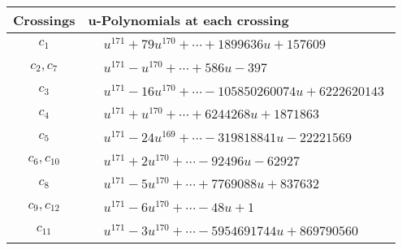 \documentclass[1p]{elsarticle_modified}
\theoremstyle{definition}
\begin{document}
\begin{tabular}{m{50pt}|m{274pt}}
Crossings & \hspace{64pt}u-Polynomials at each crossing \\
\hline $$\begin{aligned}c_{1}\end{aligned}$$&$\begin{aligned}
&u^{171}+79 u^{170}+\cdots+1899636 u+157609
\end{aligned}$\\
\hline $$\begin{aligned}c_{2},c_{7}\end{aligned}$$&$\begin{aligned}
&u^{171}- u^{170}+\cdots+586 u-397
\end{aligned}$\\
\hline $$\begin{aligned}c_{3}\end{aligned}$$&$\begin{aligned}
&u^{171}-16 u^{170}+\cdots-105850260074 u+6222620143
\end{aligned}$\\
\hline $$\begin{aligned}c_{4}\end{aligned}$$&$\begin{aligned}
&u^{171}+u^{170}+\cdots+6244268 u+1871863
\end{aligned}$\\
\hline $$\begin{aligned}c_{5}\end{aligned}$$&$\begin{aligned}
&u^{171}-24 u^{169}+\cdots-319818841 u-22221569
\end{aligned}$\\
\hline $$\begin{aligned}c_{6},c_{10}\end{aligned}$$&$\begin{aligned}
&u^{171}+2 u^{170}+\cdots-92496 u-62927
\end{aligned}$\\
\hline $$\begin{aligned}c_{8}\end{aligned}$$&$\begin{aligned}
&u^{171}-5 u^{170}+\cdots+7769088 u+837632
\end{aligned}$\\
\hline $$\begin{aligned}c_{9},c_{12}\end{aligned}$$&$\begin{aligned}
&u^{171}-6 u^{170}+\cdots-48 u+1
\end{aligned}$\\
\hline $$\begin{aligned}c_{11}\end{aligned}$$&$\begin{aligned}
&u^{171}-3 u^{170}+\cdots-5954691744 u+869790560
\end{aligned}$\\
\hline
\end{tabular}\\~\\
\end{document}
